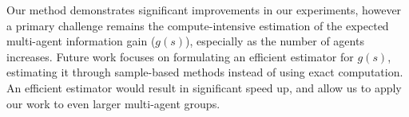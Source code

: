 \documentclass[letterpaper, 10 pt, conference]{IEEEConference}
\begin{document}
Our method demonstrates significant improvements in our experiments, however a primary challenge remains the compute-intensive estimation of the expected multi-agent information gain ($g(s)$), especially as the number of agents increases. Future work focuses on formulating an efficient estimator for $g(s)$, estimating it through sample-based methods instead of using exact computation. An efficient estimator would result in significant speed up, and allow us to apply our work to even larger multi-agent groups.


\addtolength{\textheight}{-12cm}


\end{document}
